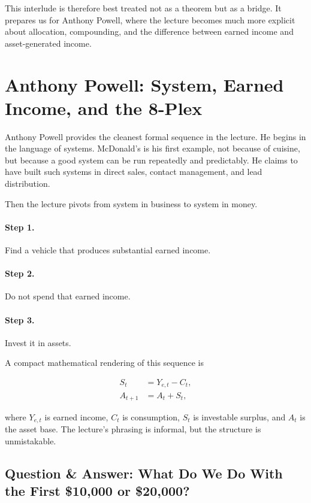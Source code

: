 This interlude is therefore best treated not as a theorem but as a bridge. It prepares us for Anthony Powell, where the lecture becomes much more explicit about allocation, compounding, and the difference between earned income and asset-generated income.

\section{Anthony Powell: System, Earned Income, and the 8-Plex}

Anthony Powell provides the cleanest formal sequence in the lecture. He begins in the language of systems. McDonald's is his first example, not because of cuisine, but because a good system can be run repeatedly and predictably. He claims to have built such systems in direct sales, contact management, and lead distribution.

Then the lecture pivots from system in business to system in money.

\paragraph{Step 1.} Find a vehicle that produces substantial earned income.

\paragraph{Step 2.} Do not spend that earned income.

\paragraph{Step 3.} Invest it in assets.

A compact mathematical rendering of this sequence is

\begin{align}
S_t &= Y_{e,t} - C_t,\\
A_{t+1} &= A_t + S_t,
\end{align}

where \(Y_{e,t}\) is earned income, \(C_t\) is consumption, \(S_t\) is investable surplus, and \(A_t\) is the asset base. The lecture's phrasing is informal, but the structure is unmistakable.

\subsection{Question \& Answer: What Do We Do With the First \$10{,}000 or \$20{,}000?}


